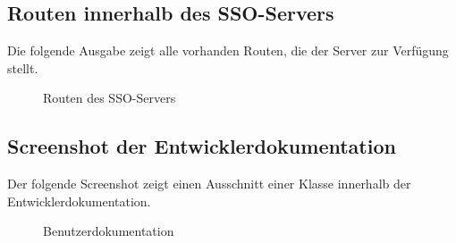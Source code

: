 \subsection{Routen innerhalb des SSO-Servers}
\label{app:routes}
Die folgende Ausgabe zeigt alle vorhanden Routen, die der Server zur Verfügung stellt.
\begin{figure}[htb]
\centering
{}
\caption{Routen des SSO-Servers}
\end{figure}
\clearpage

\subsection{Screenshot der Entwicklerdokumentation}
\label{app:phpdoc}
Der folgende Screenshot zeigt einen Ausschnitt einer Klasse innerhalb der Entwicklerdokumentation.
\begin{figure}[htb]
\centering
{}
\caption{Benutzerdokumentation}
\end{figure}
\clearpage


